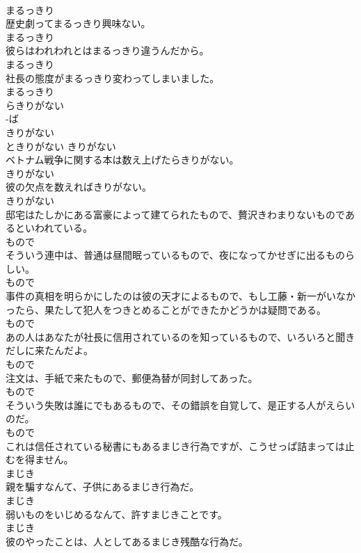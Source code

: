 \documentclass[8pt]{extreport}
\begin{document}
\begin{CJK}{UTF8}{min}
\\	まるっきり	
\\	歴史劇ってまるっきり興味ない。	
\\	まるっきり	
\\	彼らはわれわれとはまるっきり違うんだから。	
\\	まるっきり	
\\	社長の態度がまるっきり変わってしまいました。	
\\	まるっきり	
\\	らきりがない	
\\	-ば
\\	きりがない	
\\	ときりがない	きりがない	
\\	ベトナム戦争に関する本は数え上げたらきりがない。	
\\	きりがない	
\\	彼の欠点を数えればきりがない。	
\\	きりがない	
\\	邸宅はたしかにある富豪によって建てられたもので、贅沢きわまりないものであるといわれている。	
\\	もので	
\\	そういう連中は、普通は昼間眠っているもので、夜になってかせぎに出るものらしい。	
\\	もので	
\\	事件の真相を明らかにしたのは彼の天才によるもので、もし工藤・新一がいなかったら、果たして犯人をつきとめることができたかどうかは疑問である。	
\\	もので	
\\	あの人はあなたが社長に信用されているのを知っているもので、いろいろと聞きだしに来たんだよ。	
\\	もので	
\\	注文は、手紙で来たもので、郵便為替が同封してあった。	
\\	もので	
\\	そういう失敗は誰にでもあるもので、その錯誤を自覚して、是正する人がえらいのだ。	
\\	もので	
\\	これは信任されている秘書にもあるまじき行為ですが、こうせっぱ詰まっては止むを得ません。	
\\	まじき	
\\	親を騙すなんて、子供にあるまじき行為だ。	
\\	まじき	
\\	弱いものをいじめるなんて、許すまじきことです。	
\\	まじき	
\\	彼のやったことは、人としてあるまじき残酷な行為だ。	

\end{CJK}
\end{document}
